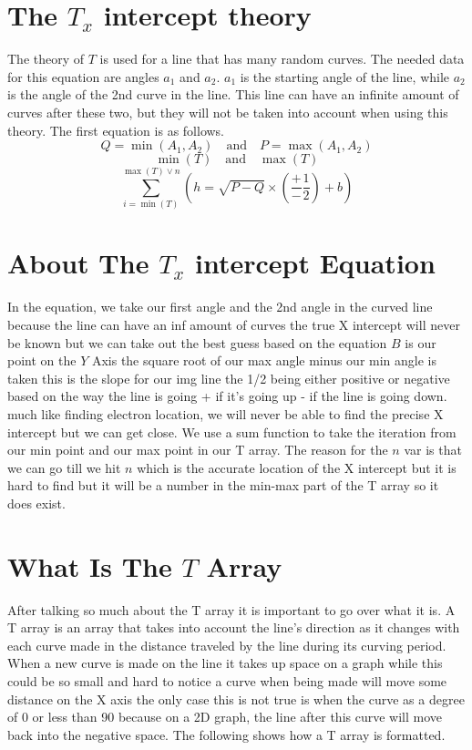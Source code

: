 \documentclass{article}
\begin{document}
\section{The \(T_x\) intercept theory}
The theory of \(T\) is used for a line that has many random curves. The needed data for this equation are angles \(a_1\) and \(a_2\). \(a_1\) is the starting angle of the line, while \(a_2\) is the angle of the 2nd curve in the line. This line can have an infinite amount of curves after these two, but they will not be taken into account when using this theory. The first equation is as follows.
\[
Q = \min(A_1, A_2) \quad \text{and} \quad P = \max(A_1, A_2)
\]
\[
\min(T) \quad \text{and} \quad \max(T)
\]
\[
\sum_{i=\min(T)}^{\max(T) \vee n} \left( h = \sqrt{P - Q} \times \left( \frac{+}{-} \frac{1}{2} \right) + b \right)
\]

\section{About The \(T_x\) intercept Equation}
In the equation, we take our first angle and the 2nd angle in the curved line because the line can have an inf amount of curves the true X intercept will never be known but we can take out the best guess based on the equation \(B\) is our point on the \(Y\) Axis the square root of our max angle minus our min angle is taken this is the slope for our img line the 1/2 being either positive or negative based on the way the line is going + if it's going up - if the line is going down. much like finding electron location, we will never be able to find the precise X intercept but we can get close. We use a sum function to take the iteration from our min point and our max point in our T array. The reason for the \(n\) var is that we can go till we hit \(n\) which is the accurate location of the X intercept but it is hard to find but it will be a number in the min-max part of the T array so it does exist. 
\section{What Is The \(T\) Array}

After talking so much about the T array it is important to go over what it is. A T array is an array that takes into account the line's direction as it changes with each curve made in the distance traveled by the line during its curving period. When a new curve is made on the line it takes up space on a graph while this could be so small and hard to notice a curve when being made will move some distance on the X axis the only case this is not true is when the curve as a degree of 0 or less than 90 because on a 2D graph, the line after this curve will move back into the negative space. The following shows how a T array is formatted.
\end{document}

